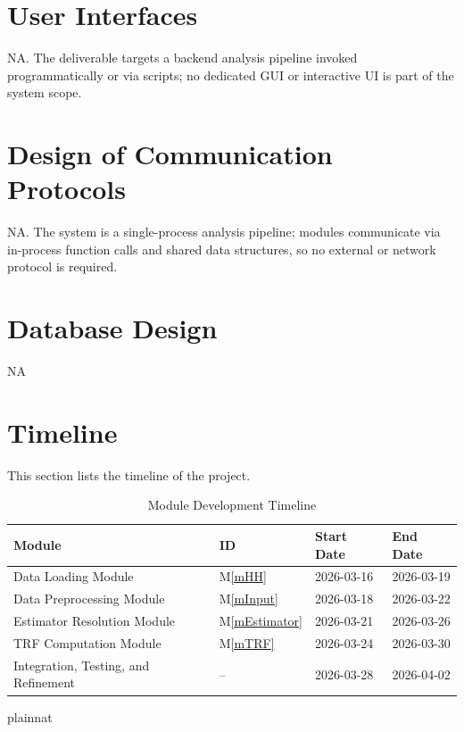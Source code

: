 \documentclass[12pt, titlepage]{article}
\newcommand{\mref}[1]{M\ref{#1}}
\begin{document}

\section{User Interfaces}
NA. The deliverable targets a backend analysis pipeline invoked programmatically
or via scripts; no dedicated GUI or interactive UI is part of the system scope.

\section{Design of Communication Protocols}
NA. The system is a single-process analysis pipeline; modules communicate via
in-process function calls and shared data structures, so no external or network
protocol is required.

\section{Database Design}
NA

\section{Timeline}
This section lists the timeline of the project.

\begin{table}[H]
  \centering
  \caption{Module Development Timeline}
  \begin{tabular}{l l l l}
  \toprule
  \textbf{Module} & \textbf{ID} & \textbf{Start Date} & \textbf{End Date} \\
  \midrule
  Data Loading Module & \mref{mHH} & 2026-03-16 & 2026-03-19 \\
  Data Preprocessing Module & \mref{mInput} & 2026-03-18 & 2026-03-22 \\
  Estimator Resolution Module & \mref{mEstimator} & 2026-03-21 & 2026-03-26 \\
  TRF Computation Module & \mref{mTRF} & 2026-03-24 & 2026-03-30 \\
  Integration, Testing, and Refinement & -- & 2026-03-28 & 2026-04-02 \\
  \bottomrule
  \end{tabular}
  \end{table}


 {plainnat}


\newpage{}
\end{document}
